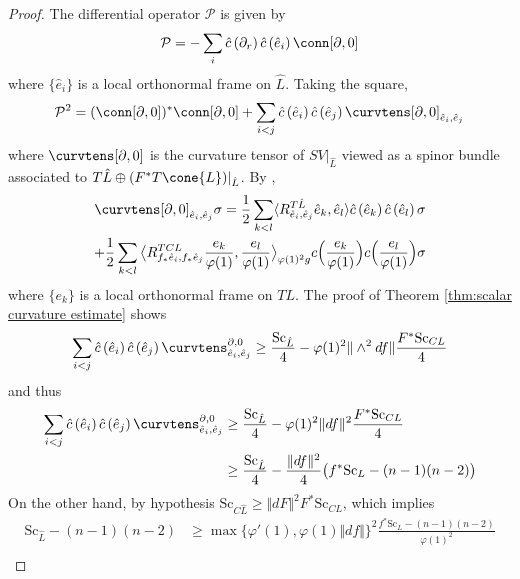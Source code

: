 \documentclass[12pt, reqno]{amsart}
\theoremstyle{plain} %
\theoremstyle{definition}
\theoremstyle{remark}
\numberwithin{equation}{section}
\newcommand{\dom}[1]{\hat{#1}}
\newcommand{\onorm}[1]{\Vert #1 \Vert}
\newcommand{\cbar}[1]{\dom{c}\left(#1\right)}
\newcommand{\Sc}{\mathrm{Sc}}
\newcommand{\inner}[1]{\langle #1 \rangle}
\newcommand{\binner}[1]{\big< #1 \big>}
\begin{document}
\begin{proof}
    The differential operator \(\mathcal{P}\) is given by
    \begin{equation*}
        \mathcal{P} = -\sum_i \cbar{\partial_r} \cbar{\dom{e}_i} \conn[\partial, 0]
    \end{equation*}
    where \(\{\dom{e}_i\}\) is a local orthonormal frame on \(\dom{L}\).
    Taking the square,
    \begin{equation*}
        \mathcal{P}^2 = (\conn[\partial, 0])^* \conn[\partial, 0] + \sum_{i < j} \cbar{\dom{e}_i} \cbar{\dom{e}_j} \curvtens[\partial, 0]_{\dom{e}_i, \dom{e}_j}
    \end{equation*}
    where \(\curvtens[\partial, 0]\) is the curvature tensor of \(SV|_{\dom{L}}\) viewed as a spinor bundle associated to \(T\dom{L} \oplus (F^*T\cone{L})|_{\dom{L}}\).
    By \cite[Theorem~4.15]{Lawson:1989},
    \begin{multline*}
        \curvtens[\partial, 0]_{\dom{e}_i, \dom{e}_j} \sigma = \frac{1}{2} \sum_{k < l} \inner{R_{\dom{e}_i, \dom{e}_j}^{T\dom{L}} \dom{e}_k, \dom{e}_l} \cbar{\dom{e}_k} \cbar{\dom{e}_l} \sigma \\
        + \frac{1}{2} \sum_{k < l} \binner{R_{f_*\dom{e}_i, f_*\dom{e}_j}^{TCL} \frac{e_k}{\varphi(1)}, \frac{e_l}{\varphi(1)}}_{\varphi(1)^2 g} c\Big(\frac{e_k}{\varphi(1)}\Big) c\Big(\frac{e_l}{\varphi(1)}\Big) \sigma
    \end{multline*}
    where \(\{e_k\}\) is a local orthonormal frame on \(TL\).
    The proof of Theorem \ref{thm:scalar curvature estimate} shows
    \begin{equation*}
        \sum_{i < j} \cbar{\dom{e}_i} \cbar{\dom{e}_j} \curvtens_{\dom{e}_i, \dom{e}_j}^{\partial, 0} \geq \frac{\Sc_{\dom{L}}}{4} - \varphi(1)^2 \onorm{\wedge^2 df} \frac{F^*\Sc_{CL}}{4} \notag
    \end{equation*}
    and thus
    \begin{align}
        \sum_{i < j} \cbar{\dom{e}_i} \cbar{\dom{e}_j} \curvtens_{\dom{e}_i, \dom{e}_j}^{\partial, 0} &\geq \frac{\Sc_{\dom{L}}}{4} - \varphi(1)^2 \onorm{df}^2 \frac{F^*\Sc_{CL}}{4} \notag \\
        \label{eqn:curvature estimate on cone} &\geq \frac{\Sc_{\dom{L}}}{4} - \frac{\onorm{df}^2}{4} \big( f^*\Sc_L - (n-1)(n-2) \big)
    \end{align}
    On the other hand, by hypothesis \(\Sc_{C\dom{L}} \geq \onorm{dF}^2 F^* \Sc_{CL}\), which implies
    \begin{align*}
        \Sc_{\dom{L}} - (n-1)(n-2) &\geq \max\{\varphi'(1), \varphi(1) \onorm{df}\}^2 \frac{f^*\Sc_L - (n-1)(n-2)}{\varphi(1)^2} \\

\end{align*}
\end{proof}
\end{document}
